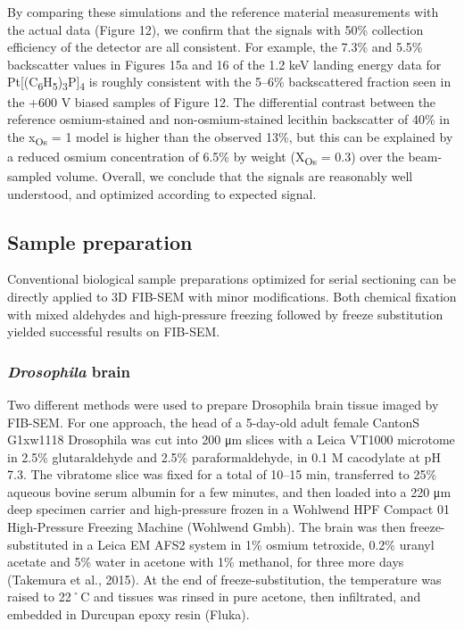 \documentclass{article}
\begin{document}
By comparing these simulations and the reference material measurements with the actual data (Figure 12), we confirm that the signals with 50\% collection efficiency of the detector are all consistent. For example, the 7.3\% and 5.5\% backscatter values in Figures 15a and 16 of the 1.2 keV landing energy data for Pt[(C\textsubscript{6}H\textsubscript{5})\textsubscript{3}P]\textsubscript{4} is roughly consistent with the 5–6\% backscattered fraction seen in the +600 V biased samples of Figure 12. The differential contrast between the reference osmium-stained and non-osmium-stained lecithin backscatter of 40\% in the x\textsubscript{Os} = 1 model is higher than the observed 13\%, but this can be explained by a reduced osmium concentration of 6.5\% by weight (X\textsubscript{Os} = 0.3) over the beam-sampled volume. Overall, we conclude that the signals are reasonably well understood, and optimized according to expected signal.

\subsection*{Sample preparation}

Conventional biological sample preparations optimized for serial sectioning can be directly applied to 3D FIB-SEM with minor modifications. Both chemical fixation with mixed aldehydes and high-pressure freezing followed by freeze substitution yielded successful results on FIB-SEM.

\subsubsection*{\emph{Drosophila} brain}

Two different methods were used to prepare Drosophila brain tissue imaged by FIB-SEM. For one approach, the head of a 5-day-old adult female CantonS G1xw1118 Drosophila was cut into 200 μm slices with a Leica VT1000 microtome in 2.5\% glutaraldehyde and 2.5\% paraformaldehyde, in 0.1 M cacodylate at pH 7.3. The vibratome slice was fixed for a total of 10–15 min, transferred to 25\% aqueous bovine serum albumin for a few minutes, and then loaded into a 220 μm deep specimen carrier and high-pressure frozen in a Wohlwend HPF Compact 01 High-Pressure Freezing Machine (Wohlwend Gmbh). The brain was then freeze-substituted in a Leica EM AFS2 system in 1\% osmium tetroxide, 0.2\% uranyl acetate and 5\% water in acetone with 1\% methanol, for three more days (Takemura et al., 2015). At the end of freeze-substitution, the temperature was raised to 22˚C and tissues was rinsed in pure acetone, then infiltrated, and embedded in Durcupan epoxy resin (Fluka).
\end{document}
